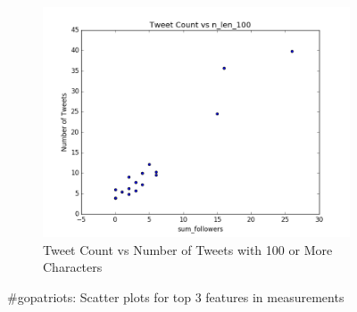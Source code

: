 \documentclass[12pt]{article}
\begin{document}
\begin{figure}[H]
\begin{subfigure}{.45\textwidth}
\includegraphics[width=\textwidth]{figures/count_vs_n_len_100_tweets_gopatriots.png}
\caption{Tweet Count vs Number of Tweets with 100 or More Characters }
\label{part1:fig:LC}
\end{subfigure}

\caption{\#gopatriots: Scatter plots for top 3 features in measurements}
\label{part1:fig}
\end{figure}
\end{document}

